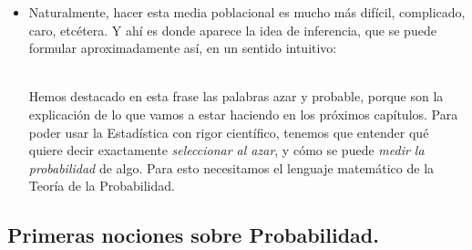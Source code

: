 \begin{itemize}
    \item Naturalmente, hacer esta media poblacional es mucho más difícil, complicado, caro, etcétera. Y ahí es donde aparece la idea de inferencia, que se puede formular aproximadamente así, en un sentido intuitivo:
    \begin{center}
    \end{center}
    \quad\\
    Hemos destacado en esta frase las palabras azar y probable, porque son la explicación de lo que vamos a estar haciendo en los próximos capítulos. Para poder usar la Estadística con rigor científico, tenemos que entender qué quiere decir exactamente {\em seleccionar al azar}, y cómo se puede {\em medir la probabilidad} de algo. Para esto necesitamos el lenguaje matemático de la Teoría de la Probabilidad.

\end{itemize}

\subsection{Primeras nociones sobre Probabilidad.}

